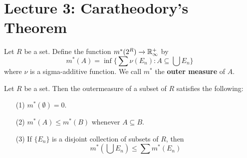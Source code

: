 \section*{Lecture 3: Caratheodory's Theorem}

\begin{definition}
    Let $R$ be a set. Define the function $m^*(2^R) \xrightarrow{} \mathbb{R}^+_\infty$
    by
    \begin{equation*}
        m^*(A)=\inf{\{\sum{\nu(E_n)} : A \subseteq \bigcup{E_n} \}}
    \end{equation*}
    where $\nu$ is a sigma-additive function. We call  $m^*$ the  \textbf{outer
    measure} of $A$.
\end{definition}

\begin{theorem}\label{thoerem_9}
    Let $R$ be a set. Then the outermeasure of a subset of $R$ satisfies the
    following:
    \begin{enumerate}
        \item[(1)] $m^*(\emptyset)=0$.

        \item[(2)] $m^*(A) \leq m^*(B)$ whenever $A \subseteq B$.

        \item[(3)] If $\{E_n\}$ is a disjoint collection of subsets of $R$, then
            \begin{equation*}
                m^*(\bigcup{E_n}) \leq \sum{m^*(E_n)}
            \end{equation*}
    \end{enumerate}
\end{theorem}
